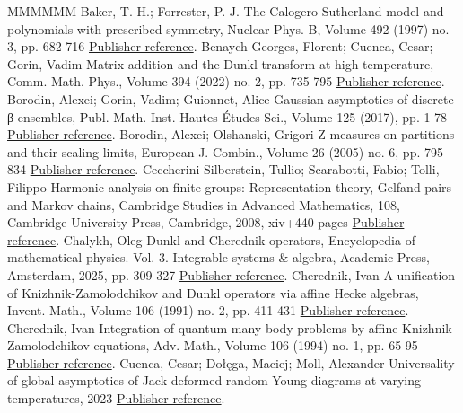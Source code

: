 \documentclass[11pt]{article}
\theoremstyle{definition}
\numberwithin{equation}{section}
\begin{document}
\begin{thebibliography}{MMMMMM}
 Baker, T. H.; Forrester, P. J. The Calogero-Sutherland model and polynomials with prescribed symmetry, Nuclear Phys. B, Volume 492 (1997) no. 3, pp. 682-716 \href{https://alco.centre-mersenne.org/articles/10.5802/alco.451/#baker1997calogero}{Publisher reference}.
 Benaych-Georges, Florent; Cuenca, Cesar; Gorin, Vadim Matrix addition and the Dunkl transform at high temperature, Comm. Math. Phys., Volume 394 (2022) no. 2, pp. 735-795 \href{https://alco.centre-mersenne.org/articles/10.5802/alco.451/#benaych2022matrix}{Publisher reference}.
 Borodin, Alexei; Gorin, Vadim; Guionnet, Alice Gaussian asymptotics of discrete β-ensembles, Publ. Math. Inst. Hautes Études Sci., Volume 125 (2017), pp. 1-78 \href{https://alco.centre-mersenne.org/articles/10.5802/alco.451/#borodin2017gaussian}{Publisher reference}.
 Borodin, Alexei; Olshanski, Grigori Z-measures on partitions and their scaling limits, European J. Combin., Volume 26 (2005) no. 6, pp. 795-834 \href{https://alco.centre-mersenne.org/articles/10.5802/alco.451/#borodin2005z}{Publisher reference}.
 Ceccherini-Silberstein, Tullio; Scarabotti, Fabio; Tolli, Filippo Harmonic analysis on finite groups: Representation theory, Gelfand pairs and Markov chains, Cambridge Studies in Advanced Mathematics, 108, Cambridge University Press, Cambridge, 2008, xiv+440 pages \href{https://alco.centre-mersenne.org/articles/10.5802/alco.451/#ceccherini2008harmonic}{Publisher reference}.
 Chalykh, Oleg Dunkl and Cherednik operators, Encyclopedia of mathematical physics. Vol. 3. Integrable systems \& algebra, Academic Press, Amsterdam, 2025, pp. 309-327 \href{https://alco.centre-mersenne.org/articles/10.5802/alco.451/#chalykh2024dunkl}{Publisher reference}.
 Cherednik, Ivan A unification of Knizhnik-Zamolodchikov and Dunkl operators via affine Hecke algebras, Invent. Math., Volume 106 (1991) no. 2, pp. 411-431 \href{https://alco.centre-mersenne.org/articles/10.5802/alco.451/#cherednik1991unification}{Publisher reference}.
 Cherednik, Ivan Integration of quantum many-body problems by affine Knizhnik-Zamolodchikov equations, Adv. Math., Volume 106 (1994) no. 1, pp. 65-95 \href{https://alco.centre-mersenne.org/articles/10.5802/alco.451/#cherednik1994integration}{Publisher reference}.
 Cuenca, Cesar; Dołęga, Maciej; Moll, Alexander Universality of global asymptotics of Jack-deformed random Young diagrams at varying temperatures, 2023 \href{https://alco.centre-mersenne.org/articles/10.5802/alco.451/#cuenca2023universality}{Publisher reference}.

\end{thebibliography}
\end{document}
